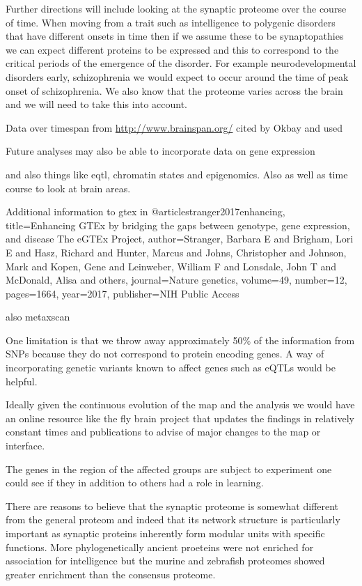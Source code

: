 Further directions will include looking at the synaptic proteome over the course of time. When moving from a trait such as intelligence to polygenic disorders that have different onsets in time then if we assume these to be synaptopathies we can expect different proteins to be expressed and this to correspond to the critical periods of the emergence of the disorder. For example neurodevelopmental disorders early, schizophrenia we would expect to occur around the time of peak onset of schizophrenia. We also know that the proteome varies across the brain and we will need to take this into account.

Data over timespan from \url{http://www.brainspan.org/} cited by Okbay and used 

Future analyses may also be able to incorporate data on gene expression

and also things like eqtl, chromatin states and epigenomics. Also as well as time course to look at brain areas. 

Additional information to gtex in
@article{stranger2017enhancing,
  title={Enhancing GTEx by bridging the gaps between genotype, gene expression, and disease The eGTEx Project},
  author={Stranger, Barbara E and Brigham, Lori E and Hasz, Richard and Hunter, Marcus and Johns, Christopher and Johnson, Mark and Kopen, Gene and Leinweber, William F and Lonsdale, John T and McDonald, Alisa and others},
  journal={Nature genetics},
  volume={49},
  number={12},
  pages={1664},
  year={2017},
  publisher={NIH Public Access}
}

also metaxscan

One limitation is that we throw away approximately 50\% of the information from SNPs because they do not correspond to protein encoding genes. A way of incorporating genetic variants known to affect genes such as eQTLs would be helpful. 

Ideally given the continuous evolution of the map and the analysis we would have an online resource like the fly brain project that updates the findings in relatively constant times and publications to advise of major changes to the map or interface. 

The genes in the region of the affected groups are subject to experiment one could see if they in addition to others had a role in learning.

There are reasons to believe that the synaptic proteome is somewhat different from the general proteom and indeed that its network structure is particularly important as synaptic proteins inherently form modular units with specific functions. More phylogenetically ancient proeteins were not enriched for association for intelligence but the murine and zebrafish proteomes showed greater enrichment than the consensus proteome.

